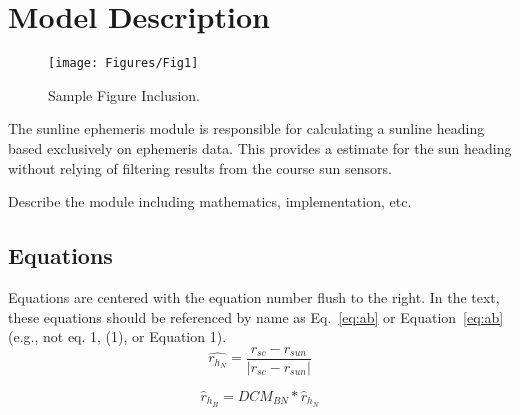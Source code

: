 
\section{Model Description}

\begin{figure}[H]
	\centerline{
		\texttt{[image: Figures/Fig1]}
	}
	\caption{Sample Figure Inclusion.}
	\label{fig:Fig1}
\end{figure}

The sunline ephemeris module is responsible for calculating a sunline heading based exclusively on ephemeris data. This provides a estimate for the sun heading without relying of filtering results from the course sun sensors. 

Describe the module including mathematics, implementation, etc.

\subsection{Equations}
Equations are centered with the equation number flush to the right. In the text, these equations should be referenced by name as Eq.~\eqref{eq:ab} or Equation~\eqref{eq:ab} (e.g., not eq.  1, (1), or Equation 1).
\begin{equation}
	\hat{r_{h_N}} = \frac{r_{sc} - r_{sun}}{|r_{sc} - r_{sun}|}
\end{equation}

\begin{equation}
	\hat{r}_{h_B} = DCM_{BN}*\hat{r}_{h_N}
\end{equation}

